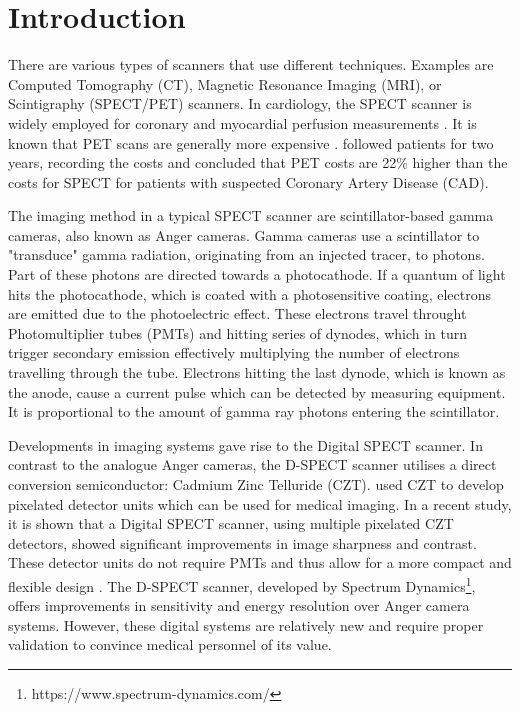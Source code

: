 \chapter{Introduction}
\label{ch:Intro}


There are various types of scanners that use different techniques. Examples are Computed Tomography (CT), Magnetic Resonance Imaging (MRI), or Scintigraphy (SPECT/PET) scanners. In cardiology, the SPECT scanner is widely employed for coronary and myocardial perfusion measurements \citep{rahmim2008pet}. It is known that PET scans are generally more expensive \citep{hlatky2014economic, RadioPead2018}. \cite{hlatky2014economic} followed patients for two years, recording the costs and concluded that PET costs are 22\% higher than the costs for SPECT for patients with suspected Coronary Artery Disease (CAD).

The imaging method in a typical SPECT scanner are scintillator-based gamma cameras, also known as Anger cameras. Gamma cameras use a scintillator to "transduce" gamma radiation, originating from an injected tracer, to photons. Part of these photons are directed towards a photocathode. If a quantum of light hits the photocathode, which is coated with a photosensitive coating, electrons are emitted due to the photoelectric effect. These electrons travel throught Photomultiplier tubes (PMTs) and hitting series of dynodes, which in turn trigger secondary emission effectively multiplying the number of electrons travelling through the tube. Electrons hitting the last dynode, which is known as the anode, cause a current pulse which can be detected by measuring equipment. It is proportional to the amount of gamma ray photons entering the scintillator\citep{CZTTech2009}.

Developments in imaging systems gave rise to the Digital SPECT scanner. In contrast to the analogue Anger cameras, the D-SPECT scanner utilises a direct conversion semiconductor: Cadmium Zinc Telluride (CZT). \cite{wagenaar2004cdte} used CZT to develop pixelated detector units which can be used for medical imaging. In a recent study, it is shown that a Digital SPECT scanner, using multiple pixelated CZT detectors, showed significant improvements in image sharpness and contrast\citep{goshen2018feasibility}. These detector units do not require PMTs and thus allow for a more compact and flexible design \citep{erlandsson2009performance}. The D-SPECT scanner, developed by Spectrum Dynamics\footnote{https://www.spectrum-dynamics.com/}, offers improvements in sensitivity and energy resolution \citep{SpectDynam2018} over Anger camera systems. However, these digital systems are relatively new and require proper validation to convince medical personnel of its value.

